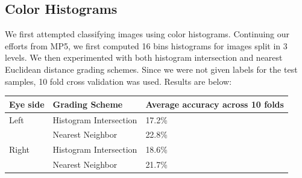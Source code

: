 \documentclass{article} %
\begin{document}
\subsection{Color Histograms}

We first attempted classifying images using color histograms. Continuing our efforts from MP5, we first computed 16 bins histograms for images split in 3 levels. We then experimented with both histogram intersection and nearest Euclidean distance grading schemes. Since we were not given labels for the test samples, 10 fold cross validation was used. Results are below:

\begin{tabular}{| l | l | l |}
\hline
Eye side & Grading Scheme & Average accuracy across 10 folds \\ \hline
Left & Histogram Intersection & 17.2\% \\ \hline
 & Nearest Neighbor & 22.8\% \\ \hline
Right & Histogram Intersection & 18.6\% \\ \hline
 & Nearest Neighbor & 21.7\% \\ \hline
\end{tabular} \\ \\
\\ \\
\end{document}
